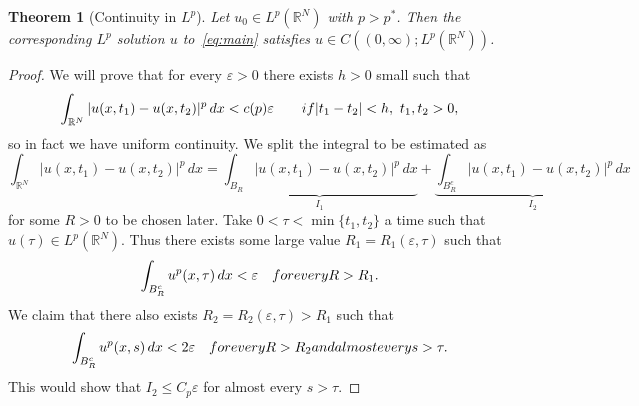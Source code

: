 \documentclass[10pt,a4paper]{amsart}
\newtheorem{theorem}{Theorem}
\begin{document}
\begin{theorem}[Continuity in $L^p$]\label{Lp continuity}
    Let $u_0 \in L^p(\mathbb{R}^N) $ with $p > p^*$. Then the corresponding $L^p$ solution \( u \) to~\eqref{eq:main} satisfies $u \in C((0,\infty); L^p(\mathbb{R}^N))$.
\end{theorem}

\begin{proof}
We will prove that for every $\varepsilon>0$ there exists $h>0$ small such that
$$
    \int_{\mathbb{R}^N}|u(x,t_1)-u(x,t_2)|^p\,dx< c(p)\varepsilon\qquad \textup{if }|t_1-t_2|<h,\ t_1,t_2>0,
$$
so in fact we have uniform continuity. We split the integral to be estimated as
$$
    \int_{\mathbb{R}^N}|u(x,t_1)-u(x,t_2)|^p\,dx=\underbrace{\int_{B_R}|u(x,t_1)-u(x,t_2)|^p\,dx}_{I_1}+\underbrace{\int_{B^c_R}|u(x,t_1)-u(x,t_2)|^p\,dx}_{I_2}
$$
for some $R>0$ to be chosen later. Take $0<\tau<\min\{t_1,t_2\}$ a time such that $u(\tau)\in L^p(\mathbb{R}^N)$. Thus there exists some large value $R_1=R_1(\varepsilon,\tau)$ such that 
$$
    \int_{B_R^c}u^p(x,\tau)\,dx<\varepsilon\quad\textup{for every }R>R_1.
$$
We claim that  there also exists $R_2=R_2(\varepsilon,\tau)>R_1$ such that
$$
    \int_{B^c_R}u^p(x,s)\,dx<2\varepsilon\quad\textup{for every }R>R_2\textup{ and almost every }s>\tau. 
$$
This would show that $I_2\le C_p \varepsilon$ for almost every $s>\tau$. 


\end{proof}
\end{document}
